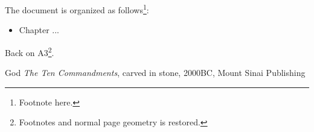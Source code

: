 \documentclass[11pt,twoside,a4paper,pagesize]{report}
\begin{document}
\clearpage

The document is organized as follows\footnote{Footnote here.}:
\begin{itemize}
\item Chapter ... 
\end{itemize}


\clearpage
Back on A3\footnote{Footnotes and normal page geometry is restored.}.



\renewcommand{\bibname}{References}

\begin{thebibliography}{1}
    God {\em The Ten Commandments}, carved in stone, 2000BC, Mount Sinai Publishing
\end{thebibliography}
\end{document}
